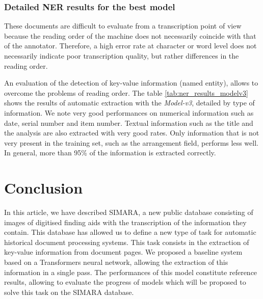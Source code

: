 \documentclass[runningheads]{llncs}
\begin{document}
\subsubsection{Detailed NER results for the best model}

These documents are difficult to evaluate from a transcription point of view because the reading order of the machine does not necessarily coincide with that of the annotator. Therefore, a high error rate at character or word level does not necessarily indicate poor transcription quality, but rather differences in the reading order.

An evaluation of the detection of key-value information (named entity), allows to overcome the problems of reading order. The table \ref{tab:ner_results_modelv3} shows the results of automatic extraction with the \textit{Model-v3}, detailed by type of information. We note very good performances on numerical information such as date, serial number and item number. Textual information such as the title and the analysis are also extracted with very good rates. Only information that is not very present in the training set, such as the arrangement field, performs less well. In general, more than 95\% of the information is extracted correctly.


\section{Conclusion}

In this article, we have described SIMARA, a new public database consisting of images of digitised finding aids with the transcription of the information they contain. This database has allowed us to define a new type of task for automatic historical document processing systems. This task consists in the extraction of key-value information from document pages. 
We proposed a baseline system based on a Transformers neural network, allowing the extraction of this information in a single pass. The performances of this model constitute reference results, allowing to evaluate the progress of models which will be proposed to solve this task on the SIMARA database.



\end{document}
